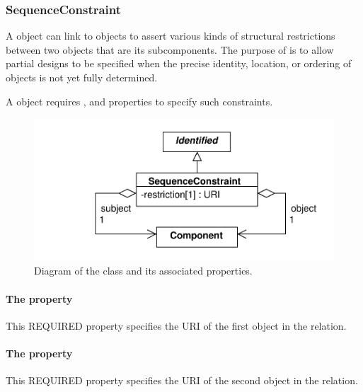 \subsubsection{SequenceConstraint}
\label{sec:SequenceConstraint}
A  object can link to  objects to assert various kinds of structural restrictions between two  objects that are its subcomponents. 
The purpose of  is to allow partial designs to be specified when the precise identity, location, or ordering of  objects is not yet fully determined.

A  object requires ,  and  properties to specify such constraints.

\begin{figure}[ht]
\begin{center}
\includegraphics[scale=0.6]{uml/sequence_constraint}
\caption[]{Diagram of the  class and its associated properties.}
\label{uml:sequence_constraint}
\end{center}
\end{figure}

\paragraph{The  property}\label{sec:subject}
\label{sec:subject}
This REQUIRED property specifies the URI of the first  object in the relation.

\paragraph{The  property}\label{sec:object}
\label{sec:object}
This REQUIRED property specifies the URI of the second  object in the relation.

